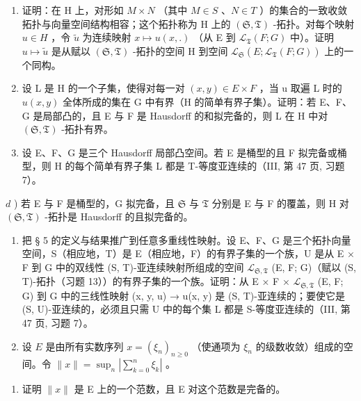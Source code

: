 \begin{enumerate}
\def\labelenumi{\alph{enumi})}
\item
  证明：在 H 上，对形如 \(M \times N\) （其中 \(M \in S\) 、\(N \in T\) ）的集合的一致收敛拓扑与向量空间结构相容；这个拓扑称为 H 上的 \((\mathfrak{S}, \mathfrak{T})\) -拓扑。对每个映射 \(u \in H\) ，令 \(\tilde{u}\) 为连续映射 \(x \mapsto u(x, .)\) （从 E 到 \(\mathcal{L}_{\mathfrak{T}}(F; G)\) 中）。证明 \(u \mapsto \tilde{u}\) 是从赋以 \((\mathfrak{S}, \mathfrak{T})\) -拓扑的空间 H 到空间 \(\mathcal{L}_{\mathfrak{S}}(E; \mathcal{L}_{\mathfrak{T}}(F; G))\) 上的一个同构。
\item
  设 L 是 H 的一个子集，使得对每一对 \((x, y) \in E \times F\) ，当 u 取遍 L 时的 \(u(x, y)\) 全体所成的集在 G 中有界（H 的简单有界子集）。证明：若 E、F、G 是局部凸的，且 E 与 F 是 Hausdorff 的和拟完备的，则 L 在 H 中对 \((\mathfrak{S}, \mathfrak{T})\) -拓扑有界。
\item
  设 E、F、G 是三个 Hausdorff 局部凸空间。若 E 是桶型的且 F 拟完备或桶型，则 H 的每个简单有界子集 L 都是 T-等度亚连续的（III, 第 47 页, 习题 7）。
\end{enumerate}

\(d\) ) 若 E 与 F 是桶型的，G 拟完备，且 \(\mathfrak{S}\) 与 \(\mathfrak{T}\) 分别是 E 与 F 的覆盖，则 H 对 \((\mathfrak{S},\mathfrak{T})\) -拓扑是 Hausdorff 的且拟完备的。

\begin{enumerate}
\def\labelenumi{\arabic{enumi})}
\setcounter{enumi}{13}
\item
  把 § 5 的定义与结果推广到任意多重线性映射。设 E、F、G 是三个拓扑向量空间，S（相应地，T）是 E（相应地，F）的有界子集的一个族，U 是从 E × F 到 G 中的双线性 (S, T)-亚连续映射所组成的空间 \(\mathcal{L}_{\mathfrak{S},\mathfrak{T}}\) (E, F; G)（赋以 (S, T)-拓扑（习题 13））的有界子集的一个族。证明：从 E × F × \(\mathcal{L}_{\mathfrak{S},\mathfrak{T}}\) (E, F; G) 到 G 中的三线性映射 (x, y, u) → u(x, y) 是 (S, T)-亚连续的；要使它是 (S, U)-亚连续的，必须且只需 U 中的每个集 L 都是 S-等度亚连续的（III, 第 47 页, 习题 7）。
\item
  设 \(E\) 是由所有实数序列 \(x = (\xi_n)_{n \geqslant 0}\) （使通项为 \(\xi_n\) 的级数收敛）组成的空间。令 \(\| x \| = \sup_n | \sum_{k=0}^n \xi_k |\) 。
\end{enumerate}

\begin{enumerate}
\def\labelenumi{\alph{enumi})}
\tightlist
\item
  证明 \(\| x\|\) 是 E 上的一个范数，且 E 对这个范数是完备的。
\end{enumerate}

